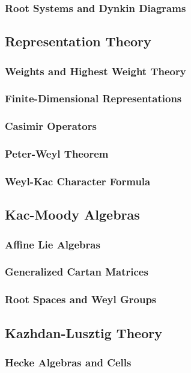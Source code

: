 \documentclass[12pt]{article}
\begin{document}
\subsubsection{Root Systems and Dynkin Diagrams}

\subsection{Representation Theory}
\subsubsection{Weights and Highest Weight Theory}
\subsubsection{Finite-Dimensional Representations}
\subsubsection{Casimir Operators}
\subsubsection{Peter-Weyl Theorem}
\subsubsection{Weyl-Kac Character Formula}

\subsection{Kac-Moody Algebras}
\subsubsection{Affine Lie Algebras}
\subsubsection{Generalized Cartan Matrices}
\subsubsection{Root Spaces and Weyl Groups}

\subsection{Kazhdan-Lusztig Theory}
\subsubsection{Hecke Algebras and Cells}
\end{document}
